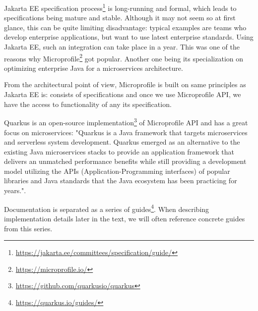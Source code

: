 \documentclass[../main.tex]{subfiles}
\begin{document}
Jakarta EE specification process\footnote{\url{https://jakarta.ee/committees/specification/guide/}} is long-running and formal, which leads to specifications being mature and stable. Although it may not seem so at first glance, this can be quite limiting disadvantage: typical examples are teams who develop enterprise applications, but want to use latest enterprise standards. Using Jakarta EE, such an integration can take place in a year. This was one of the reasons why Microprofile\footnote{\url{https://microprofile.io/}} got popular. Another one being its specialization on optimizing enterprise Java for a microservices architecture.

From the architectural point of view, Microprofile is built on same principles as Jakarta EE is: consists of specifications and once we use Microprofile API, we have the access to functionality of any its specification.

Quarkus is an open-source implementation\footnote{\url{https://github.com/quarkusio/quarkus}} of Microprofile API and has a great focus on microservices: "Quarkus is a Java framework that targets microservices and serverless system
development. Quarkus emerged as an alternative to the existing Java
microservices stacks to provide an application framework that delivers an
unmatched performance benefits while still providing a development model
utilizing the APIs (Application-Programming interfaces) of popular libraries
and Java standards that the Java ecosystem has been practicing for years."\cite{quarkusinaction}.

Documentation is separated as a series of guides\footnote{\url{https://quarkus.io/guides/}}. When describing implementation details later in the text, we will often reference concrete guides from this series.
\end{document}
